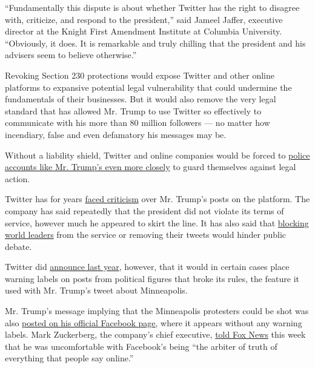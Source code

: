``Fundamentally this dispute is about whether Twitter has the right to
disagree with, criticize, and respond to the president,'' said Jameel
Jaffer, executive director at the Knight First Amendment Institute at
Columbia University. ``Obviously, it does. It is remarkable and truly
chilling that the president and his advisers seem to believe
otherwise.''

Revoking Section 230 protections would expose Twitter and other online
platforms to expansive potential legal vulnerability that could
undermine the fundamentals of their businesses. But it would also remove
the very legal standard that has allowed Mr. Trump to use Twitter so
effectively to communicate with his more than 80 million followers ---
no matter how incendiary, false and even defamatory his messages may be.

Without a liability shield, Twitter and online companies would be forced
to
\href{https://www.nytimes3xbfgragh.onion/2020/05/28/us/politics/trump-jack-dorsey.html}{police
accounts like Mr. Trump's even more closely} to guard themselves against
legal action.

Twitter has for years
\href{https://www.nytimes3xbfgragh.onion/2019/10/15/technology/trump-twitter-account.html}{faced
criticism} over Mr. Trump's posts on the platform. The company has said
repeatedly that the president did not violate its terms of service,
however much he appeared to skirt the line. It has also said that
\href{https://blog.twitter.com/en_us/topics/company/2018/world-leaders-and-twitter.html}{blocking
world leaders} from the service or removing their tweets would hinder
public debate.

Twitter did
\href{https://www.nytimes3xbfgragh.onion/2019/06/27/technology/twitter-politicans-labels-abuse.html}{announce
last year}, however, that it would in certain cases place warning labels
on posts from political figures that broke its rules, the feature it
used with Mr. Trump's tweet about Minneapolis.

Mr. Trump's message implying that the Minneapolis protesters could be
shot was also
\href{https://www.facebookcorewwwi.onion/DonaldTrump/posts/10164767134275725}{posted
on his official Facebook page}, where it appears without any warning
labels. Mark Zuckerberg, the company's chief executive,
\href{https://www.foxnews.com/media/facebook-mark-zuckerberg-twitter-fact-checking-trump}{told
Fox News} this week that he was uncomfortable with Facebook's being
``the arbiter of truth of everything that people say online.''

